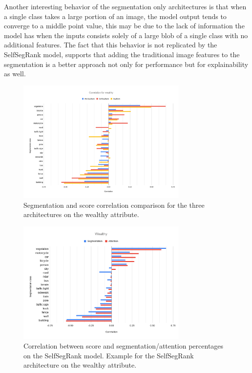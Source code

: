 Another interesting behavior of the segmentation only architectures is
that when a single class takes a large portion of an image,
the model output tends to converge to a middle point value, this may be due to the lack of
information the model has when the inputs consists solely of a large  blob of a single class with no
additional features. The fact that this behavior is not replicated by the SelfSegRank model, supports
that adding the traditional image features to the segmentation is a better approach not only for performance
but for explainability as well.

\begin{figure}[ht]
	\begin{center}
	\includegraphics[width=0.75\textwidth]{./figures/correlation_comparison.png}
	\caption[Correlation comparison]{
		Segmentation and score correlation comparison for the three architectures on the wealthy
		attribute.
        }
	\label{fig:correlation_comparison}
	\end{center}
\end{figure}

\begin{figure}[ht]
	\begin{center}
	\includegraphics[width=0.75\textwidth]{./figures/selfsegrank_correlation.png}
	\caption[SelfSegRank Correlation]{
		Correlation between score and segmentation/attention percentages on the
		SelfSegRank model. Example for the SelfSegRank architecture on the wealthy attribute.
        }
	\label{fig:correlation_selfsegrank}
	\end{center}
\end{figure}

